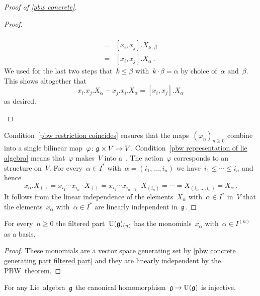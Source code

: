 \begin{proof}[Proof of \cref{pbw concrete}]
\begin{proof}
\begin{description}
\begin{align*}
          \\
          ={}&
          [x_i, x_j].X_{k \cdot \beta}
          \\
          ={}&
          [x_i, x_j].X_\alpha \,.
        \end{align*}
        We used for the last two steps that~$k \leq \beta$ with~$k \cdot \beta = \alpha$ by choice of~$\alpha$ and~$\beta$.
        This shows altogether that
        \[
          x_i.x_j.X_\alpha - x_j.x_i.X_\alpha
          =
          [x_i, x_j].X_\alpha
        \]
        as desired.
      \qedhere
    \end{description}
  \end{proof}
  
  Condition~\ref*{pbw restriction coincides} ensures that the maps~$(\varphi_n)_{n \geq 0}$ combine into a single bilinear map~$\varphi \colon \mathfrak{g} \times V \to V$.
  Condition~\ref*{pbw representation of lie algebra} means that~$\varphi$ makes~$V$ into a~{\representation{$\glie$}}.
  The action~$\varphi$ corresponds to an~{\module{$\Univ(\glie)$}} structure on~$V$.
  For every~$\alpha \in I^*$ with~$\alpha = (i_1, \dotsc, i_n)$ we have~$i_1 \leq \dotsb \leq i_n$ and hence
  \[
    x_\alpha . X_{()}
    =
    x_{i_1} \dotsm x_{i_n} \cdot X_{()}
    =
    x_{i_1} \dotsm x_{i_{n-1}} \cdot X_{(i_n)}
    =
    \dotsb
    =
    X_{(i_1, \dotsc, i_n)}
    =
    X_\alpha  \,.
  \]
  It follows from the linear independence of the elements~$X_\alpha$ with~$\alpha \in I^*$ in~$V$ that the elements~$x_\alpha$ with~$\alpha \in I^*$ are linearly independent in~$\glie$.
\end{proof}


\begin{corollary}
  \label{pbw concrete basis part filtered part}
  For every~$n \geq 0$ the filtered part~$\operatorname{U}(\mathfrak{g})_{(n)}$ has the monomials~$x_\alpha$ with~$\alpha \in I^{(n)}$ as a basis.
\end{corollary}


\begin{proof}
  These monomials are a vector space generating set by \cref{pbw concrete generating part filtered part} and they are linearly independent by the PBW~theorem.
\end{proof}


\begin{corollary}
  \label{embedding into uea}
  For any Lie~algebra~$\glie$ the canonical homomorphism~$\mathfrak{g} \to \operatorname{U}(\mathfrak{g})$ is injective.
\end{corollary}



